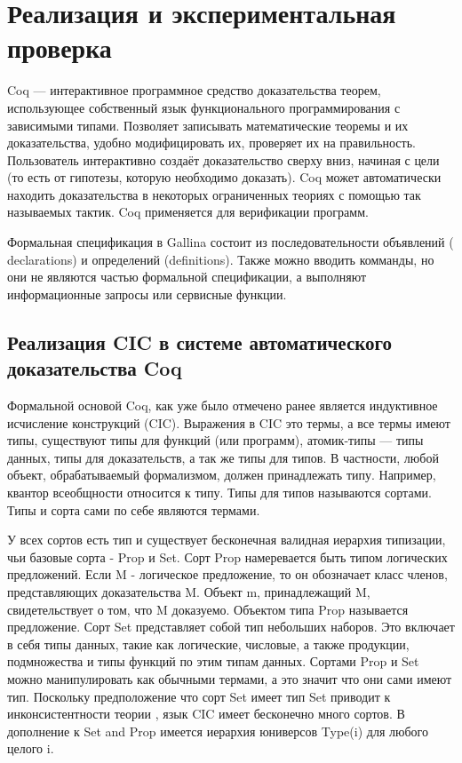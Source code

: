 \chapter{Реализация и экспериментальная проверка}

Coq — интерактивное программное средство доказательства
теорем, использующее собственный язык функционального
программирования с зависимыми типами. Позволяет записывать
математические теоремы и их доказательства, удобно модифицировать
их, проверяет их на правильность. Пользователь интерактивно создаёт
доказательство сверху вниз, начиная с цели (то есть от гипотезы,
которую необходимо доказать). Coq может автоматически находить
доказательства в некоторых ограниченных теориях с помощью так
называемых тактик. Coq применяется для верификации программ\cite{huet}.

Формальная спецификация в Gallina состоит из последовательности объявлений (
declarations) и определений (definitions). Также можно вводить комманды, но
они не являются частью формальной спецификации, а выполняют информационные 
запросы или сервисные функции\cite{huet}. 

\section{Реализация CIC в системе автоматического доказательства Coq}
Формальной основой Coq, как уже было отмечено ранее является индуктивное 
исчисление конструкций (CIC). Выражения в CIC  это термы, а все термы имеют 
типы, существуют типы для функций (или программ), атомик-типы --- типы 
данных, типы для доказательств, а так же типы для типов.  В частности, любой 
объект, обрабатываемый формализмом, должен принадлежать типу. Например, 
квантор всеобщности относится к типу. Типы для типов называются сортами. Типы 
и сорта сами по себе являются термами.

У всех сортов есть тип и существует бесконечная валидная иерархия типизации, 
чьи базовые сорта - Prop и Set.
Сорт Prop намеревается быть типом логических предложений. Если M - логическое 
предложение, то он обозначает класс членов, представляющих доказательства M. 
Объект m, принадлежащий M, свидетельствует о том, что M доказуемо. Объектом 
типа Prop называется предложение.
Сорт Set представляет собой тип небольших наборов. Это включает в себя типы 
данных, такие как логические, числовые, а также продукции, подмножества и 
типы функций по этим типам данных.
Сортами Prop и Set можно манипулировать как обычными термами, а это значит 
что они сами имеют тип. Поскольку предположение что сорт Set имеет тип Set 
приводит к инконсистентности теории \cite{coquand1986analysis}, язык CIC 
имеет бесконечно много сортов. В дополнение к Set and Prop имеется иерархия 
юниверсов Type(i) для любого целого i.

